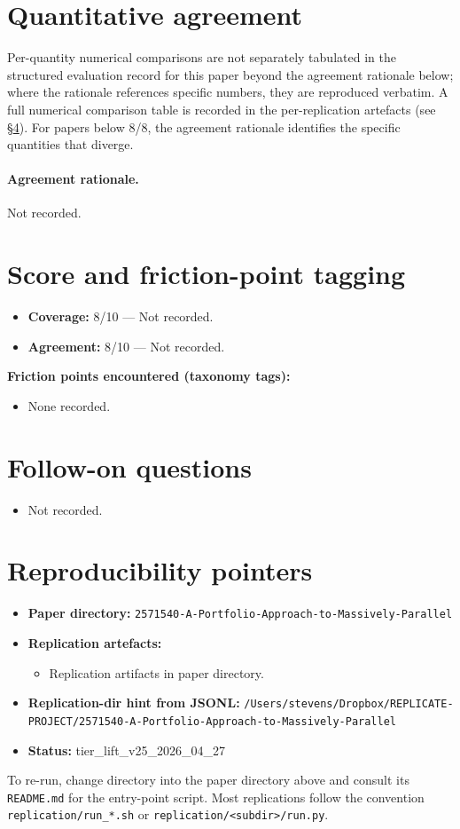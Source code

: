 \documentclass[11pt]{article}
\begin{document}
\section{Quantitative agreement}
Per-quantity numerical comparisons are not separately tabulated in the structured evaluation record for this paper beyond the agreement rationale below; where the rationale references specific numbers, they are reproduced verbatim. A full numerical comparison table is recorded in the per-replication artefacts (see \S\ref{sec:repro}). For papers below 8/8, the agreement rationale identifies the specific quantities that diverge.

\paragraph{Agreement rationale.} Not recorded.

\section{Score and friction-point tagging}\label{sec:friction}
\begin{itemize}
\item \textbf{Coverage:} 8/10 --- Not recorded.
\item \textbf{Agreement:} 8/10 --- Not recorded.
\end{itemize}

\noindent\textbf{Friction points encountered (taxonomy tags):}
\begin{itemize}
\item None recorded.
\end{itemize}

\section{Follow-on questions}
\begin{itemize}
\item Not recorded.
\end{itemize}

\section{Reproducibility pointers}\label{sec:repro}
\begin{itemize}
\item \textbf{Paper directory:} \texttt{2571540-A-Portfolio-Approach-to-Massively-Parallel}
\item \textbf{Replication artefacts:}
\begin{itemize}
\item Replication artifacts in paper directory.
\end{itemize}
\item \textbf{Replication-dir hint from JSONL:} \texttt{/Users/stevens/Dropbox/REPLICATE-PROJECT/2571540-A-Portfolio-Approach-to-Massively-Parallel}
\item \textbf{Status:} tier\_lift\_v25\_2026\_04\_27
\end{itemize}

To re-run, change directory into the paper directory above and consult its \texttt{README.md} for the entry-point script. Most replications follow the convention \texttt{replication/run\_*.sh} or \texttt{replication/<subdir>/run.py}.
\end{document}
